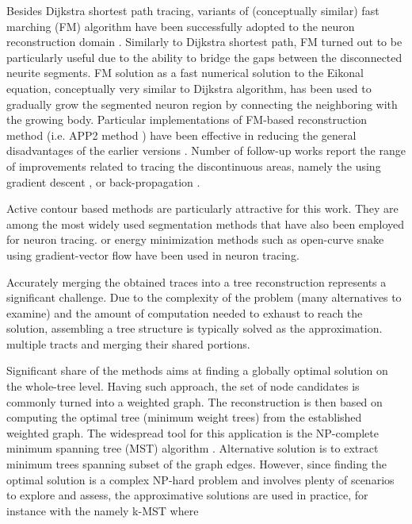 Besides Dijkstra shortest path tracing, variants of (conceptually similar) fast marching (FM) algorithm \cite{sethian1999level} have been successfully adopted to the neuron reconstruction domain \cite{xiao2013app2}. Similarly to Dijkstra shortest path, FM turned out to be particularly useful due to the ability to bridge the gaps between the disconnected neurite segments. FM solution as a fast numerical solution to the Eikonal equation, conceptually very similar to Dijkstra algorithm, has been used to gradually grow the segmented neuron region by connecting the neighboring with the growing body. Particular implementations of FM-based reconstruction method (i.e. APP2 method \cite{xiao2013app2}) have been effective in reducing the general disadvantages of the earlier versions \cite{van2007subvoxel}. Number of follow-up works report the range of improvements related to tracing the discontinuous areas, namely the using gradient descent \cite{mukherjee2012automated}, or back-propagation  \cite{liu2016rivulet}.

Active contour based methods are particularly attractive for this work. They are among the most widely used segmentation methods that have also been employed for neuron tracing.
or energy minimization methods such as open-curve snake using gradient-vector flow
\cite{schmitt2004new}
 \cite{wang2011broadly} have been used in neuron tracing.

Accurately merging the obtained traces into a tree reconstruction represents a significant challenge. Due to the complexity of the problem (many alternatives to examine) and the amount of computation needed to exhaust to reach the solution, assembling  a tree structure is typically solved as the approximation. multiple tracts and merging their shared portions.


Significant share of the methods aims at finding a globally optimal solution on the whole-tree level. Having such approach, the set of node candidates is commonly turned into a weighted graph. The reconstruction is then based on computing the optimal tree (minimum weight trees) from the established weighted graph. The widespread tool for this application is the NP-complete minimum spanning tree (MST) algorithm \cite{peng2015bigneuron}. Alternative solution is to extract minimum trees spanning subset of the graph edges. However, since finding the optimal solution is a complex NP-hard problem and involves plenty of scenarios to explore and assess, the approximative solutions are used in practice, for instance  with the  namely k-MST \cite{turetken2011automated} where 

